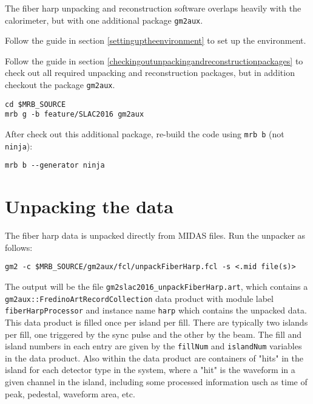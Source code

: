 The fiber harp unpacking and reconstruction software overlaps heavily with the calorimeter, but with one additional package \verb+gm2aux+.

\vspace{4mm}\par\noindent  Follow the guide in section \ref{settinguptheenvironment} to set up the environment.

\vspace{4mm}\par\noindent  Follow the guide in section \ref{checkingoutunpackingandreconstructionpackages} to check out all required unpacking and reconstruction packages, but in addition checkout the package \verb+gm2aux+.
%
\begin{Verbatim}[frame=single]
cd $MRB_SOURCE
mrb g -b feature/SLAC2016 gm2aux
\end{Verbatim}
%

\noindent After check out this additional package, re-build the code using \verb+mrb b+ (not \verb+ninja+):

%
\begin{Verbatim}[frame=single]
mrb b --generator ninja
\end{Verbatim}
%

\section{Unpacking the data}

The fiber harp data is unpacked directly from MIDAS files. Run the unpacker as follows:
%
\begin{Verbatim}[frame=single]
gm2 -c $MRB_SOURCE/gm2aux/fcl/unpackFiberHarp.fcl -s <.mid file(s)>
\end{Verbatim}
%

The output will be the file \verb+gm2slac2016_unpackFiberHarp.art+, which contains a \verb+gm2aux::FredinoArtRecordCollection+ data product with module label \verb+fiberHarpProcessor+ and instance name \verb+harp+ which contains the unpacked data. This data product is filled once per island per fill. There are typically two islands per fill, one triggered by the sync pulse and the other by the beam. The fill and island numbers in each entry are given by the \verb+fillNum+ and \verb+islandNum+ variables in the data product.
Also within the data product are containers of "hits" in the island for each detector type in the system, where a "hit" is the waveform in a given channel in the island, including some processed information usch as time of peak, pedestal, waveform area, etc.

